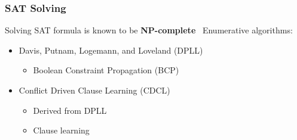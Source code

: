 \documentclass{beamer}
\begin{document}
\begin{frame}
\frametitle{SAT Solving}

	Solving SAT formula is known to be \textbf{NP-complete}~\cite{cook1971complexity}
	\vfill
	Enumerative algorithms:
	\begin{itemize}
		\item Davis, Putnam, Logemann, and Loveland (DPLL)~\cite{dpll_62}
		\begin{itemize}
			\item Boolean Constraint Propagation (BCP)
		\end{itemize}
	\vfill
		\item Conflict Driven Clause Learning (CDCL)~\cite{marques1999grasp}
		\begin{itemize}
			\item Derived from DPLL
			\item Clause learning
		\end{itemize}
	\end{itemize}

\end{frame}
%
%
\end{document}
